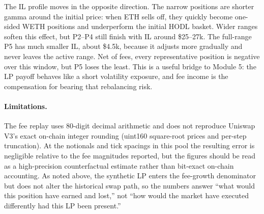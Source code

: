 The IL profile moves in the opposite direction.  The narrow positions are
shorter gamma around the initial price: when ETH sells off, they quickly become
one-sided WETH positions and underperform the initial HODL basket.  Wider
ranges soften this effect, but P2--P4 still finish with IL around
\$25--27k.  The full-range P5 has much smaller IL, about \$4.5k, because it
adjusts more gradually and never leaves the active range.  Net of fees, every
representative position is negative over this window, but P5 loses the least.
This is a useful bridge to Module 5: the LP payoff behaves like a short
volatility exposure, and fee income is the compensation for bearing that
rebalancing risk.

\paragraph{Limitations.}
The fee replay uses 80-digit decimal arithmetic and does not reproduce Uniswap
V3's exact on-chain integer rounding (uint160 square-root prices and per-step
truncation).  At the notionals and tick spacings in this pool the resulting
error is negligible relative to the fee magnitudes reported, but the figures
should be read as a high-precision counterfactual estimate rather than
bit-exact on-chain accounting.  As noted above, the synthetic LP enters the
fee-growth denominator but does not alter the historical swap path, so the
numbers answer ``what would this position have earned and lost,'' not ``how
would the market have executed differently had this LP been present.''
